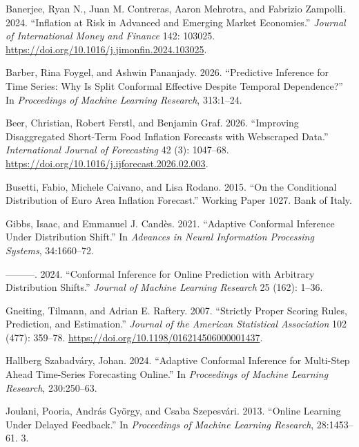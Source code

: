 \label{refs}
\begin{CSLReferences}{1}{0}
Banerjee, Ryan N., Juan M. Contreras, Aaron Mehrotra, and Fabrizio
Zampolli. 2024. {``Inflation at Risk in Advanced and Emerging Market
Economies.''} \emph{Journal of International Money and Finance} 142:
103025. \url{https://doi.org/10.1016/j.jimonfin.2024.103025}.

Barber, Rina Foygel, and Ashwin Pananjady. 2026. {``Predictive Inference
for Time Series: Why Is Split Conformal Effective Despite Temporal
Dependence?''} In \emph{Proceedings of Machine Learning Research},
313:1--24.

Beer, Christian, Robert Ferstl, and Benjamin Graf. 2026. {``Improving
Disaggregated Short-Term Food Inflation Forecasts with Webscraped
Data.''} \emph{International Journal of Forecasting} 42 (3): 1047--68.
\url{https://doi.org/10.1016/j.ijforecast.2026.02.003}.

Busetti, Fabio, Michele Caivano, and Lisa Rodano. 2015. {``On the
Conditional Distribution of Euro Area Inflation Forecast.''} Working
Paper 1027. Bank of Italy.

Gibbs, Isaac, and Emmanuel J. Candès. 2021. {``Adaptive Conformal
Inference Under Distribution Shift.''} In \emph{Advances in Neural
Information Processing Systems}, 34:1660--72.

---------. 2024. {``Conformal Inference for Online Prediction with
Arbitrary Distribution Shifts.''} \emph{Journal of Machine Learning
Research} 25 (162): 1--36.

Gneiting, Tilmann, and Adrian E. Raftery. 2007. {``Strictly Proper
Scoring Rules, Prediction, and Estimation.''} \emph{Journal of the
American Statistical Association} 102 (477): 359--78.
\url{https://doi.org/10.1198/016214506000001437}.

Hallberg Szabadváry, Johan. 2024. {``Adaptive Conformal Inference for
Multi-Step Ahead Time-Series Forecasting Online.''} In \emph{Proceedings
of Machine Learning Research}, 230:250--63.

Joulani, Pooria, András György, and Csaba Szepesvári. 2013. {``Online
Learning Under Delayed Feedback.''} In \emph{Proceedings of Machine
Learning Research}, 28:1453--61. 3.


\end{CSLReferences}
